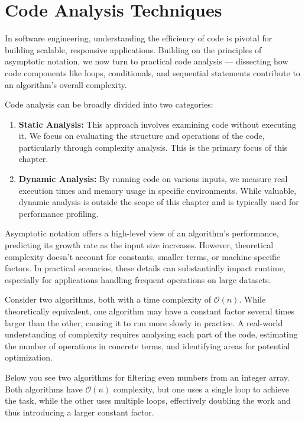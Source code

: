 \chapter{Code Analysis Techniques}\label{chap:ch11}

In software engineering, understanding the efficiency of code is pivotal for building scalable, responsive applications. Building on the principles of asymptotic notation, we now turn to practical code analysis — dissecting how code components like loops, conditionals, and sequential statements contribute to an algorithm's overall complexity.

Code analysis can be broadly divided into two categories:

\begin{enumerate}
    \item \textbf{Static Analysis:} This approach involves examining code without executing it. We focus on evaluating the structure and operations of the code, particularly through complexity analysis. This is the primary focus of this chapter.
    \item \textbf{Dynamic Analysis:} By running code on various inputs, we measure real execution times and memory usage in specific environments. While valuable, dynamic analysis is outside the scope of this chapter and is typically used for performance profiling.
\end{enumerate}

Asymptotic notation offers a high-level view of an algorithm's performance, predicting its growth rate as the input size increases. However, theoretical complexity doesn’t account for constants, smaller terms, or machine-specific factors. In practical scenarios, these details can substantially impact runtime, especially for applications handling frequent operations on large datasets.

Consider two algorithms, both with a time complexity of $\mathcal{O}(n)$. While theoretically equivalent, one algorithm may have a constant factor several times larger than the other, causing it to run more slowly in practice. A real-world understanding of complexity requires analysing each part of the code, estimating the number of operations in concrete terms, and identifying areas for potential optimization.

Below you see two algorithms for filtering even numbers from an integer array. Both algorithms have $\mathcal{O}(n)$ complexity, but one uses a single loop to achieve the task, while the other uses multiple loops, effectively doubling the work and thus introducing a larger constant factor.


